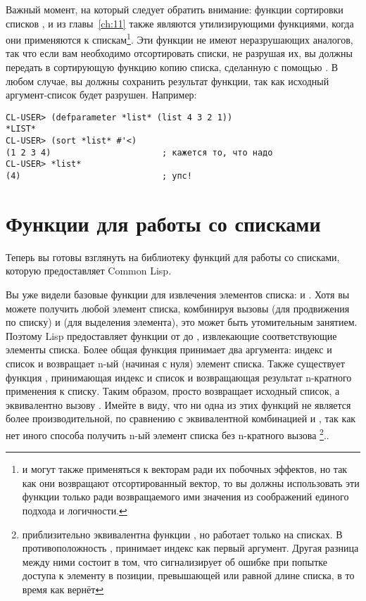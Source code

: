 Важный момент, на который следует обратить внимание: функции сортировки списков
,  и  из главы~\ref{ch:11} также являются
утилизирующими функциями, когда они применяются к спискам\footnote{ и
   могут также применяться к векторам ради их побочных эффектов, но
  так как они возвращают отсортированный вектор, то вы должны использовать эти функции только
  ради возвращаемого ими значения из соображений единого подхода и логичности.}. Эти
функции не имеют неразрушающих аналогов, так что если вам необходимо отсортировать списки,
не разрушая их, вы должны передать в сортирующую функцию копию списка, сделанную с помощью
. В любом случае, вы должны сохранить результат функции, так как исходный
аргумент-список будет разрушен. Например:

\begin{lstlisting}
CL-USER> (defparameter *list* (list 4 3 2 1))
*LIST*
CL-USER> (sort *list* #'<)
(1 2 3 4)                      ; кажется то, что надо
CL-USER> *list*
(4)                            ; упс!
\end{lstlisting}


\section{Функции для работы со списками}
\label{sec:12-list-funcs}

Теперь вы готовы взглянуть на библиотеку функций для работы со списками, которую
предоставляет Common Lisp.

Вы уже видели базовые функции для извлечения элементов списка:  и
. Хотя вы можете получить любой элемент списка, комбинируя вызовы 
(для продвижения по списку) и  (для выделения элемента), это может быть
утомительным занятием. Поэтому Lisp предоставляет функции от  до ,
извлекающие соответствующие элементы списка. Более общая функция  принимает два
аргумента: индекс и список и возвращает n-ый (начиная с нуля) элемент списка. Также
существует функция , принимающая индекс и список и возвращающая результат
n-кратного применения  к списку. Таким образом,   просто
возвращает исходный список, а   эквивалентно вызову
. Имейте в виду, что ни одна из этих функций не является более производительной,
по сравнению с эквивалентной комбинацией  и , так как нет иного
способа получить n-ый элемент списка без n-кратного вызова \footnote{
  приблизительно эквивалентна функции , но работает только на списках. В
  противоположность ,  принимает индекс как первый аргумент. Другая
  разница между ними состоит в том, что  сигнализирует об ошибке при попытке
  доступа к элементу в позиции, превышающей или равной длине списка, в то время как
   вернёт }..

